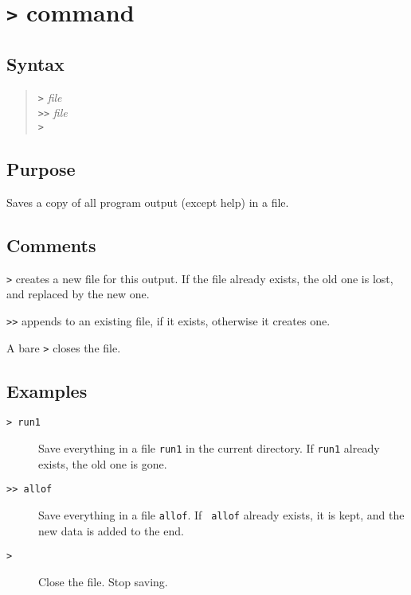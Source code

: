 \section{{\tt >} command}
\subsection{Syntax}
\begin{verse}
{\tt >} {\it file}\\
{\tt >>} {\it file}\\
{\tt >}
\end{verse}
\subsection{Purpose}

Saves a copy of all program output (except help) in a file.
\subsection{Comments}

{\tt >} creates a new file for this output.  If the file already exists, the
old one is lost, and replaced by the new one.

{\tt >>} appends to an existing file, if it exists, otherwise it creates one.

A bare {\tt >} closes the file.
\subsection{Examples}

\begin{description}

\item[{\tt > run1}] Save everything in a file {\tt run1} in the current
directory.  If {\tt run1} already exists, the old one is gone.

\item[{\tt >> allof}] Save everything in a file {\tt allof}.  If {\tt
allof} already exists, it is kept, and the new data is added to the end.

\item[{\tt >}] Close the file.  Stop saving.

\end{description}
